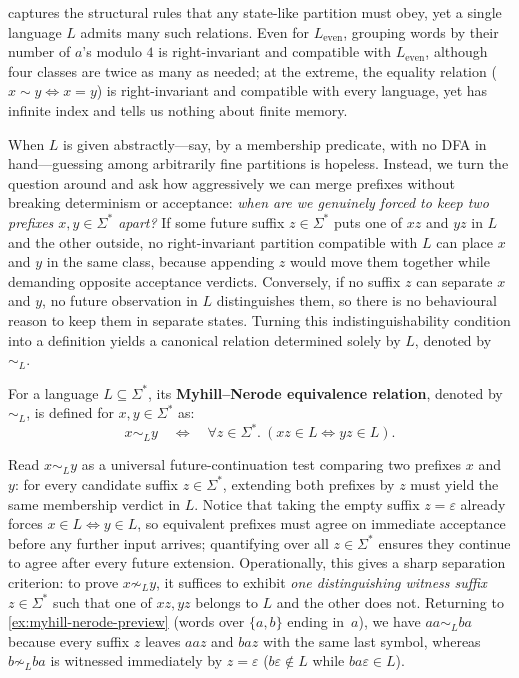  captures the structural rules that any state-like partition must obey, yet a single language $L$ admits many such relations. Even for $L_{\mathrm{even}}$, grouping words by their number of $a$'s modulo $4$ is right-invariant and compatible with $L_{\mathrm{even}}$, although four classes are twice as many as needed; at the extreme, the equality relation ($x \sim y \iff x = y$) is right-invariant and compatible with every language, yet has infinite index and tells us nothing about finite memory.

When $L$ is given abstractly---say, by a membership predicate, with no DFA in hand---guessing among arbitrarily fine partitions is hopeless. Instead, we turn the question around and ask how aggressively we can merge prefixes without breaking determinism or acceptance: \emph{when are we genuinely forced to keep two prefixes $x, y \in \Sigma^*$ apart?} If some future suffix $z \in \Sigma^*$ puts one of $xz$ and $yz$ in $L$ and the other outside, no right-invariant partition compatible with $L$ can place $x$ and $y$ in the same class, because appending $z$ would move them together while demanding opposite acceptance verdicts. Conversely, if no suffix $z$ can separate $x$ and $y$, no future observation in $L$ distinguishes them, so there is no behavioural reason to keep them in separate states. Turning this indistinguishability condition into a definition yields a canonical relation determined solely by $L$, denoted by $\sim_L$.

\begin{definition}
\label{def:myhill-nerode-relation}
For a language $L\subseteq\Sigma^*$, its \textbf{Myhill--Nerode equivalence relation}, denoted by $\sim_L$, is defined for $x, y \in \Sigma^*$ as:
\[
  x \sim_L y \quad\Longleftrightarrow\quad \forall z \in \Sigma^*.\ (xz\in L \iff yz\in L).
\]
\end{definition}

Read $x \sim_L y$ as a universal future-continuation test comparing two prefixes $x$ and $y$: for every candidate suffix $z \in \Sigma^*$, extending both prefixes by $z$ must yield the same membership verdict in $L$. Notice that taking the empty suffix $z = \varepsilon$ already forces $x \in L \iff y \in L$, so equivalent prefixes must agree on immediate acceptance before any further input arrives; quantifying over all $z \in \Sigma^*$ ensures they continue to agree after every future extension. Operationally, this gives a sharp separation criterion: to prove $x \not\sim_L y$, it suffices to exhibit \emph{one distinguishing witness suffix} $z \in \Sigma^*$ such that one of $xz, yz$ belongs to $L$ and the other does not. Returning to \cref{ex:myhill-nerode-preview} (words over $\{a,b\}$ ending in~$a$), we have $aa \sim_L ba$ because every suffix $z$ leaves $aaz$ and $baz$ with the same last symbol, whereas $b \not\sim_L ba$ is witnessed immediately by $z = \varepsilon$ ($b\varepsilon \notin L$ while $ba\varepsilon \in L$).

